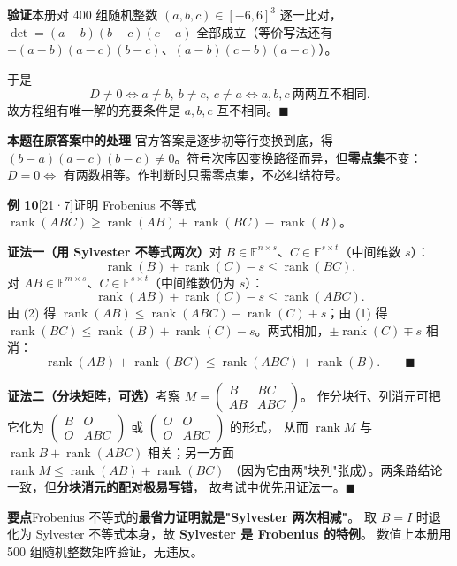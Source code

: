 \documentclass[10pt]{ctexart}
\newcommand{\FF}{\mathbb{F}}
\newcommand{\rank}{\operatorname{rank}}
\newcommand{\y}[1]{\textcolor{y21}{[21·#1]}}
\begin{document}
\textbf{验证}\quad 本册对 400 组随机整数 $(a,b,c)\in[-6,6]^3$ 逐一比对，
$\det=(a-b)(b-c)(c-a)$ 全部成立（等价写法还有 $-(a-b)(a-c)(b-c)$、$(a-b)(c-b)(a-c)$）。

于是
\[
D\ne0\iff a\ne b,\ b\ne c,\ c\ne a\iff a,b,c\ \textbf{两两互不相同}.
\]
故方程组有唯一解的充要条件是 $a,b,c$ 互不相同。$\blacksquare$

\begin{warnbox}
\textbf{本题在原答案中的处理} 官方答案是逐步初等行变换到底，得
$(b-a)(a-c)(b-c)\neq0$。符号次序因变换路径而异，但\textbf{零点集}不变：
$D=0\iff$ 有两数相等。作判断时只需零点集，不必纠结符号。
\end{warnbox}

\medskip
\textbf{例 10}\y{7}\quad 证明 Frobenius 不等式
$\rank(ABC)\ge\rank(AB)+\rank(BC)-\rank(B)$。

\textbf{证法一（用 Sylvester 不等式两次）}\quad 对 $B\in\FF^{n\times s}$、$C\in\FF^{s\times t}$（中间维数 $s$）：
\[
\rank(B)+\rank(C)-s\le\rank(BC). \tag{1}
\]
对 $AB\in\FF^{m\times s}$、$C\in\FF^{s\times t}$（中间维数仍为 $s$）：
\[
\rank(AB)+\rank(C)-s\le\rank(ABC). \tag{2}
\]
由 (2) 得 $\rank(AB)\le\rank(ABC)-\rank(C)+s$；由 (1) 得 $\rank(BC)\le\rank(B)+\rank(C)-s$。两式相加，$\pm\rank(C)\mp s$ 相消：
\[
\rank(AB)+\rank(BC)\le\rank(ABC)+\rank(B). \qquad\blacksquare
\]

\textbf{证法二（分块矩阵，可选）}\quad 考察 $M=\begin{pmatrix}B&BC\\AB&ABC\end{pmatrix}$。
作分块行、列消元可把它化为 $\begin{pmatrix}B&O\\O&ABC\end{pmatrix}$ 或 $\begin{pmatrix}O&O\\O&ABC\end{pmatrix}$ 的形式，
从而 $\rank M$ 与 $\rank B+\rank(ABC)$ 相关；另一方面 $\rank M\le\rank(AB)+\rank(BC)$
（因为它由两"块列"张成）。两条路结论一致，但\textbf{分块消元的配对极易写错}，
故考试中优先用证法一。$\blacksquare$

\begin{tipbox}
\textbf{要点}\quad Frobenius 不等式的\textbf{最省力证明就是"Sylvester 两次相减"}。
取 $B=I$ 时退化为 Sylvester 不等式本身，故 \textbf{Sylvester 是 Frobenius 的特例}。
数值上本册用 500 组随机整数矩阵验证，无违反。
\end{tipbox}

\end{document}
